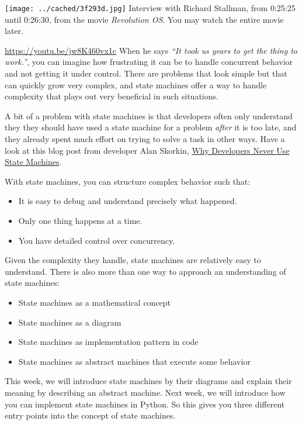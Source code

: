 \documentclass[10pt, twoside, twocolumn]{book}
\providecommand{\tightlist}{%
  \setlength{\itemsep}{0pt}\setlength{\parskip}{0pt}}
\begin{document}
\texttt{[image: ../cached/3f293d.jpg]}
Interview with Richard Stallman, from 0:25:25 until 0:26:30, from the
movie \emph{Revolution OS}. You may watch the entire movie later.

\url{https://youtu.be/jw8K460vx1c}
When he says \emph{``It took us years to get the thing to work.''}, you
can imagine how frustrating it can be to handle concurrent behavior and
not getting it under control. There are problems that look simple but
that can quickly grow very complex, and state machines offer a way to
handle complexity that plays out very beneficial in such situations.

A bit of a problem with state machines is that developers often only
understand they they should have used a state machine for a problem
\emph{after} it is too late, and they already spent much effort on
trying to solve a task in other ways. Have a look at this blog post from
developer Alan Skorkin,
\href{https://www.skorks.com/2011/09/why-developers-never-use-state-machines/}{Why
Developers Never Use State Machines}.

With state machines, you can structure complex behavior such that:

\begin{itemize}
\tightlist
\item
  It is easy to debug and understand precisely what happened.
\item
  Only one thing happens at a time.
\item
  You have detailed control over concurrency.
\end{itemize}

Given the complexity they handle, state machines are relatively easy to
understand. There is also more than one way to approach an understanding
of state machines:

\begin{itemize}
\tightlist
\item
  State machines as a mathematical concept
\item
  State machines as a diagram
\item
  State machines as implementation pattern in code
\item
  State machines as abstract machines that execute some behavior
\end{itemize}

This week, we will introduce state machines by their diagrams and
explain their meaning by describing an abstract machine. Next week, we
will introduce how you can implement state machines in Python. So this
gives you three different entry points into the concept of state
machines.
\end{document}
